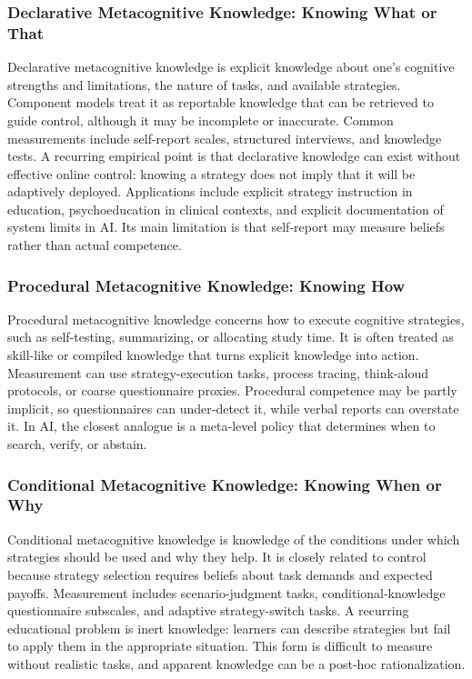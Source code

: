 \documentclass[a4paper]{article}
\begin{document}
   \subsubsection{Declarative Metacognitive Knowledge: Knowing What or That}

   Declarative metacognitive knowledge is explicit knowledge about one's cognitive strengths and limitations, the nature of tasks, and available strategies. Component models treat it as reportable knowledge that can be retrieved to guide control, although it may be incomplete or inaccurate. Common measurements include self-report scales, structured interviews, and knowledge tests. A recurring empirical point is that declarative knowledge can exist without effective online control: knowing a strategy does not imply that it will be adaptively deployed. Applications include explicit strategy instruction in education, psychoeducation in clinical contexts, and explicit documentation of system limits in AI. Its main limitation is that self-report may measure beliefs rather than actual competence.

   \subsubsection{Procedural Metacognitive Knowledge: Knowing How}

   Procedural metacognitive knowledge concerns how to execute cognitive strategies, such as self-testing, summarizing, or allocating study time. It is often treated as skill-like or compiled knowledge that turns explicit knowledge into action. Measurement can use strategy-execution tasks, process tracing, think-aloud protocols, or coarse questionnaire proxies. Procedural competence may be partly implicit, so questionnaires can under-detect it, while verbal reports can overstate it. In AI, the closest analogue is a meta-level policy that determines when to search, verify, or abstain.

   \subsubsection{Conditional Metacognitive Knowledge: Knowing When or Why}

   Conditional metacognitive knowledge is knowledge of the conditions under which strategies should be used and why they help. It is closely related to control because strategy selection requires beliefs about task demands and expected payoffs. Measurement includes scenario-judgment tasks, conditional-knowledge questionnaire subscales, and adaptive strategy-switch tasks. A recurring educational problem is inert knowledge: learners can describe strategies but fail to apply them in the appropriate situation. This form is difficult to measure without realistic tasks, and apparent knowledge can be a post-hoc rationalization.
\end{document}
